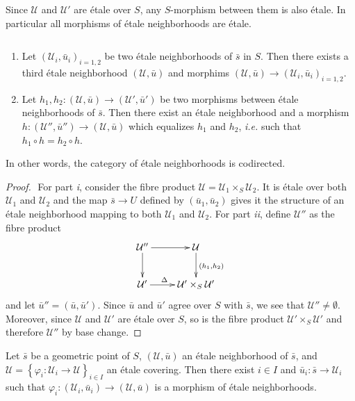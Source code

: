 \begin{remark}
Since $\mathcal{U}$ and $\mathcal{U}'$ are \'etale over $S$, any $S$-morphism 
between them is also \'etale. In particular all morphisms of \'etale 
neighborhoods are \'etale.
\end{remark}

\begin{lemma} $ $ \label{lem:CofinalityOfEtaleNbhds}
\begin{enumerate}
\item Let $(\mathcal{U}_i, \bar u_i)_{i=1, 2}$ be two \'etale neighborhoods of 
$\bar s$ in $S$. Then there exists a third \'etale neighborhood $(\mathcal{U}, 
\bar u)$ and morphims $(\mathcal{U}, \bar u) \to (\mathcal{U}_i, \bar 
u_i)_{i=1,2}$.
\item Let $h_1, h_2: (\mathcal{U}, \bar u) \to (\mathcal{U}', \bar u')$ be two 
morphisms between \'etale neighborhoods of $\bar s$. Then there exist an 
\'etale neighborhood and a morphism $h : (\mathcal{U}'', \bar u'')\to 
(\mathcal{U}, \bar u)$ which equalizes $h_1$ and $h_2$, {\it i.e.}  such that 
$h_1\circ h = h_2\circ h$.		
\end{enumerate}
\end{lemma}

\noindent
In other words, the category of \'etale neighborhoods is codirected.

\begin{proof} $ $
For part {\it i}, consider the fibre product $\mathcal{U} = \mathcal{U}_1 
\times_S \mathcal{U}_2$. It is \'etale over both $\mathcal{U}_1$ and 
$\mathcal{U}_2$ and the map $\bar s \to U$ defined by $(\bar u_1, \bar u_2)$ 
gives it the structure of an \'etale neighborhood mapping to both 
$\mathcal{U}_1$ and $\mathcal{U}_2$. For part {\it ii}, define $\mathcal{U}''$ 
as the fibre product 
$$
\xymatrix{
{\mathcal{U}''} \ar[r] \ar[d] & {\mathcal{U}} \ar^{(h_1,h_2)}[d] \\
{\mathcal{U}'} \ar^{\Delta \quad}[r] & {\mathcal{U}' \times_S \mathcal{U}'}
}
$$
and let $\bar u'' = (\bar u, \bar u')$. Since $\bar u$ and $\bar u'$ agree over 
$S$ with $\bar s$, we see that $\mathcal{U}''\neq\emptyset$. Moreover, since 
$\mathcal{U}$ and $\mathcal{U}'$ are \'etale over $S$, so is the fibre product 
$\mathcal{U}'\times_S \mathcal{U}'$ and therefore $\mathcal{U}''$ by base 
change.
\end{proof}

\begin{lemma} \label{lem:geomPointsAreInSomeOpen}
Let $\bar s$ be a geometric point of $S$, $(\mathcal{U}, \bar u)$ an \'etale 
neighborhood of $\bar s$, and $\mathcal{U} = \left\{\varphi_i : \mathcal{U}_i 
\to \mathcal{U} \right\}_{i\in I}$ an \'etale covering. Then there exist $i\in 
I$ and $\bar u_i: \bar s  \to \mathcal{U}_i$ such that $\varphi_i: 
(\mathcal{U}_i, \bar u_i) \to (\mathcal{U}, \bar u)$ is a morphism of \'etale 
neighborhoods.  
\end{lemma}

